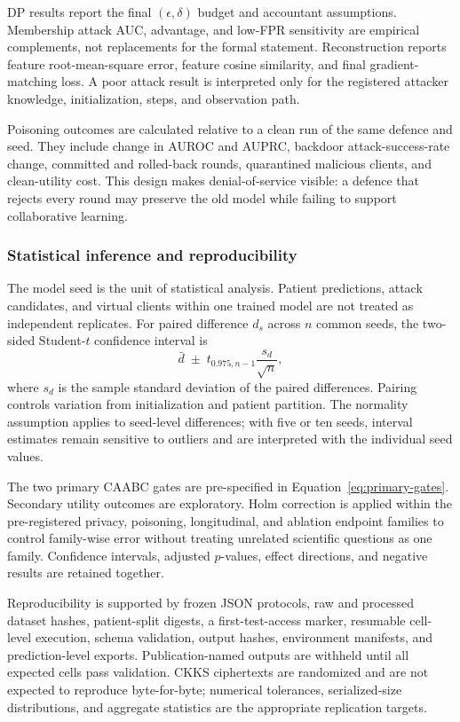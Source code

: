 DP results report the final $(\epsilon,\delta)$ budget and accountant assumptions. Membership attack AUC, advantage, and low-FPR sensitivity are empirical complements, not replacements for the formal statement. Reconstruction reports feature root-mean-square error, feature cosine similarity, and final gradient-matching loss. A poor attack result is interpreted only for the registered attacker knowledge, initialization, steps, and observation path.

Poisoning outcomes are calculated relative to a clean run of the same defence and seed. They include change in AUROC and AUPRC, backdoor attack-success-rate change, committed and rolled-back rounds, quarantined malicious clients, and clean-utility cost. This design makes denial-of-service visible: a defence that rejects every round may preserve the old model while failing to support collaborative learning.

\subsubsection{Statistical inference and reproducibility}

The model seed is the unit of statistical analysis. Patient predictions, attack candidates, and virtual clients within one trained model are not treated as independent replicates. For paired difference $d_s$ across $n$ common seeds, the two-sided Student-$t$ confidence interval is
\begin{equation}
    \bar d \;\pm\; t_{0.975,n-1}\frac{s_d}{\sqrt{n}},
    \label{eq:paired-ci}
\end{equation}
where $s_d$ is the sample standard deviation of the paired differences. Pairing controls variation from initialization and patient partition. The normality assumption applies to seed-level differences; with five or ten seeds, interval estimates remain sensitive to outliers and are interpreted with the individual seed values.

The two primary CAABC gates are pre-specified in Equation~\ref{eq:primary-gates}. Secondary utility outcomes are exploratory. Holm correction is applied within the pre-registered privacy, poisoning, longitudinal, and ablation endpoint families to control family-wise error without treating unrelated scientific questions as one family. Confidence intervals, adjusted $p$-values, effect directions, and negative results are retained together.

Reproducibility is supported by frozen JSON protocols, raw and processed dataset hashes, patient-split digests, a first-test-access marker, resumable cell-level execution, schema validation, output hashes, environment manifests, and prediction-level exports. Publication-named outputs are withheld until all expected cells pass validation. CKKS ciphertexts are randomized and are not expected to reproduce byte-for-byte; numerical tolerances, serialized-size distributions, and aggregate statistics are the appropriate replication targets.

